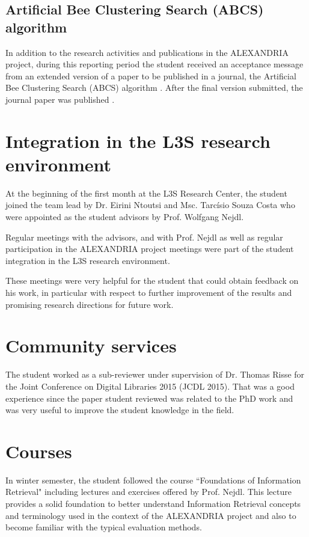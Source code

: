 \documentclass[a4paper,11pt]{report}
\begin{document}
\subsection{Artificial Bee Clustering Search (ABCS) algorithm}
In addition to the research activities and publications in the ALEXANDRIA project, during this reporting period 
the student 
received an acceptance message from an extended version of a paper to be published in
a journal, the Artificial Bee Clustering Search (ABCS) algorithm \cite{costaiwann13}. 
After the final version submitted, the journal paper was published \cite{costa2014}. 

\section{Integration in the L3S research environment}
At the beginning of the first month at the L3S Research Center, the student 
joined the team lead by Dr. Eirini Ntoutsi and Msc. Tarcísio Souza Costa who
were appointed as the student advisors by Prof. Wolfgang Nejdl. 

Regular meetings with the advisors, and with Prof. Nejdl
as well as regular participation in the ALEXANDRIA project meetings were part
of the student integration in the L3S research environment.

These meetings were very helpful for the student that could obtain feedback on
his work, in particular with respect to further improvement of the results and promising research directions for future work.

\section{Community services}

The student worked as a sub-reviewer under supervision of Dr. Thomas Risse for the 
Joint Conference on Digital Libraries 2015 (JCDL 2015). That was a good experience since
the paper student reviewed was related to the PhD work and was
very useful to improve the student knowledge in the field.

\section{Courses}

In winter semester, the student followed the course ``Foundations of Information Retrieval"
including lectures and exercises offered by Prof. Nejdl. This lecture provides a solid 
foundation to better understand Information Retrieval concepts and terminology
used in the context of the ALEXANDRIA project and also to become familiar with the  
typical evaluation methods. 
\end{document}
